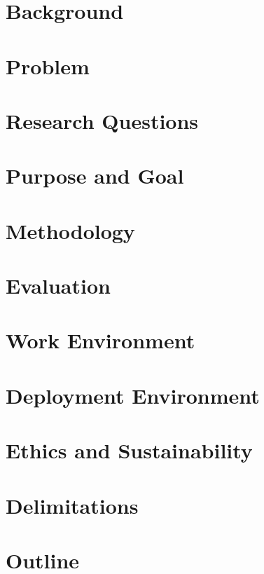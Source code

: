 \section{Background}
\section{Problem}
\section{Research Questions}
\section{Purpose and Goal}
\section{Methodology}
\section{Evaluation}
\section{Work Environment}
\section{Deployment Environment}
\section{Ethics and Sustainability}
\section{Delimitations}
\section{Outline}
